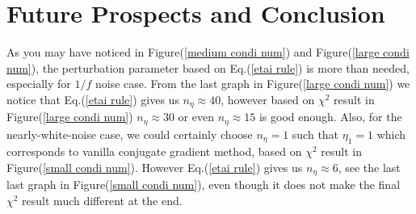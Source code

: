 \documentclass[twocolumn,linenumbers]{aastex631}
\begin{document}
\section{Future Prospects and Conclusion}
As you may have noticed in Figure(\ref{medium condi num})
and Figure(\ref{large condi num}), the perturbation parameter based on
Eq.(\ref{etai rule}) is more than needed, especially for $1/f$ noise case.
From the last graph in Figure(\ref{large condi num}) we notice that
Eq.(\ref{etai rule}) gives us $n_{\eta}\approx40$, however based on $\chi^2$
result in Figure(\ref{large condi num}) 
$n_{\eta}\approx30$ or even $n_{\eta} \approx 15$ is good enough.
Also, for the nearly-white-noise case, we could certainly choose $n_{\eta}=1$
such that $\eta_1=1$ which corresponds to vanilla conjugate gradient method,
based on $\chi^2$ result in Figure(\ref{small condi num}).
However Eq.(\ref{etai rule}) gives us $n_{\eta} \approx 6$,
see the last last graph in Figure(\ref{small condi num}),
even though it does not make the final $\chi^2$ result much different at the
end.
\end{document}
